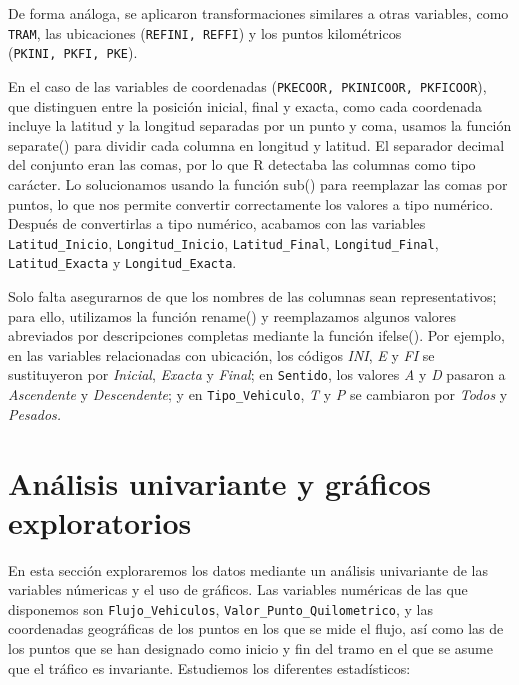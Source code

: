 \documentclass[notspecified,article,submit,moreauthors,pdftex]{Definitions/mdpi}
\begin{document}
De forma análoga, se aplicaron transformaciones similares a otras
variables, como \texttt{TRAM}, las ubicaciones (\texttt{REFINI,\ REFFI})
y los puntos kilométricos (\texttt{PKINI,\ PKFI,\ PKE}).

En el caso de las variables de coordenadas
(\texttt{PKECOOR,\ PKINICOOR,\ PKFICOOR}), que distinguen entre la
posición inicial, final y exacta, como cada coordenada incluye la
latitud y la longitud separadas por un punto y coma, usamos la función
separate() para dividir cada columna en longitud y latitud. El separador
decimal del conjunto eran las comas, por lo que R detectaba las columnas
como tipo carácter. Lo solucionamos usando la función sub() para
reemplazar las comas por puntos, lo que nos permite convertir
correctamente los valores a tipo numérico. Después de convertirlas a
tipo numérico, acabamos con las variables \texttt{Latitud\_Inicio},
\texttt{Longitud\_Inicio}, \texttt{Latitud\_Final},
\texttt{Longitud\_Final}, \texttt{Latitud\_Exacta} y
\texttt{Longitud\_Exacta}.

Solo falta asegurarnos de que los nombres de las columnas sean
representativos; para ello, utilizamos la función rename() y
reemplazamos algunos valores abreviados por descripciones completas
mediante la función ifelse(). Por ejemplo, en las variables relacionadas
con ubicación, los códigos \emph{INI}, \emph{E} y \emph{FI} se
sustituyeron por \emph{Inicial}, \emph{Exacta} y \emph{Final}; en
\texttt{Sentido}, los valores \emph{A} y \emph{D} pasaron a
\emph{Ascendente} y \emph{Descendente}; y en \texttt{Tipo\_Vehiculo},
\emph{T} y \emph{P} se cambiaron por \emph{Todos} y \emph{Pesados.}

\section{Análisis univariante y gráficos
exploratorios}\label{anuxe1lisis-univariante-y-gruxe1ficos-exploratorios}

En esta sección exploraremos los datos mediante un análisis univariante
de las variables númericas y el uso de gráficos. Las variables numéricas
de las que disponemos son \texttt{Flujo\_Vehiculos},
\texttt{Valor\_Punto\_Quilometrico}, y las coordenadas geográficas de
los puntos en los que se mide el flujo, así como las de los puntos que
se han designado como inicio y fin del tramo en el que se asume que el
tráfico es invariante. Estudiemos los diferentes estadísticos:
\end{document}
